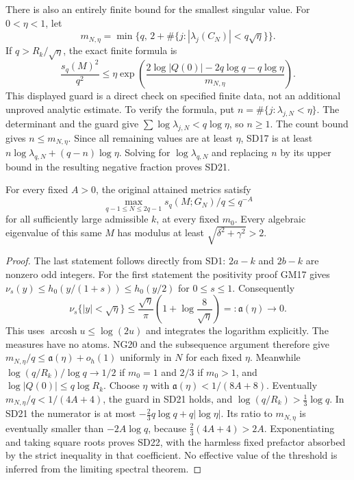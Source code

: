 There is also an entirely finite bound for the smallest singular value.
For $0<\eta<1$, let
\begin{equation}\tag{SD20}
 m_{N,\eta}=\min\{q,\,2+\#\{j:|\lambda_j(C_N)|<q\sqrt\eta\}\}.
\end{equation}
If $q>R_k/\sqrt\eta$, the exact finite formula is
\begin{equation}\tag{SD21}
\boxed{\frac{s_q(M)^2}{q^2}
\le\eta\exp\!\left(
\frac{2\log|Q(0)|-2q\log q-q\log\eta}{m_{N,\eta}}
\right).}
\end{equation}
This displayed guard is a direct check on specified finite data, not
an additional unproved analytic estimate. To verify the formula, put
$n=\#\{j:\lambda_{j,N}<\eta\}$. The determinant and the guard give
$\sum\log\lambda_{j,N}<q\log\eta$, so $n\ge1$. The count bound
gives $n\le m_{N,\eta}$. Since all remaining values are at least
$\eta$, SD17 is at least $n\log\lambda_{q,N}+(q-n)\log\eta$.
Solving for $\log\lambda_{q,N}$ and replacing $n$ by its upper bound
in the resulting negative fraction proves SD21.

\begin{osdtheorem}
For every fixed $A>0$, the original attained metrics satisfy
\begin{equation}\tag{SD22}
\boxed{\max_{q-1\le N\le2q-1}s_q(M;G_N)/q\le q^{-A}}
\end{equation}
for all sufficiently large admissible $k$, at every fixed $m_0$.
Every algebraic eigenvalue of this same $M$ has modulus at least
$\sqrt{\delta^2+\gamma^2}>2$.
\end{osdtheorem}
\begin{proof}
The last statement follows directly from SD1: $2a-k$ and $2b-k$ are
nonzero odd integers. For the first statement the positivity proof
GM17 gives $\nu_s(y)\le h_0(y/(1+s))\le h_0(y/2)$ for $0\le s\le1$.
Consequently
\begin{equation}\tag{SD23}
\nu_s\{|y|<\sqrt\eta\}
\le\frac{\sqrt\eta}{\pi}
\left(1+\log\frac8{\sqrt\eta}\right)=:\mathfrak a(\eta)
\longrightarrow0.
\end{equation}
This uses $\operatorname{arcosh}u\le\log(2u)$ and integrates the
logarithm explicitly. The measures have no atoms. NG20 and the
subsequence argument therefore give $m_{N,\eta}/q\le
\mathfrak a(\eta)+o_h(1)$ uniformly in $N$ for each fixed $\eta$.
Meanwhile $\log(q/R_k)/\log q\to1/2$ if $m_0=1$ and $2/3$ if
$m_0>1$, and $\log|Q(0)|\le q\log R_k$. Choose $\eta$ with
$\mathfrak a(\eta)<1/(8A+8)$. Eventually $m_{N,\eta}/q<1/(4A+4)$,
the guard in SD21 holds, and $\log(q/R_k)>\tfrac13\log q$.
In SD21 the numerator is at most
$-\tfrac23q\log q+q|\log\eta|$.
Its ratio to $m_{N,\eta}$ is eventually smaller than $-2A\log q$,
because $\tfrac23(4A+4)>2A$. Exponentiating and taking square roots
proves SD22, with the harmless fixed prefactor absorbed by the strict
inequality in that coefficient. No effective value of the threshold
is inferred from the limiting spectral theorem.
\end{proof}


